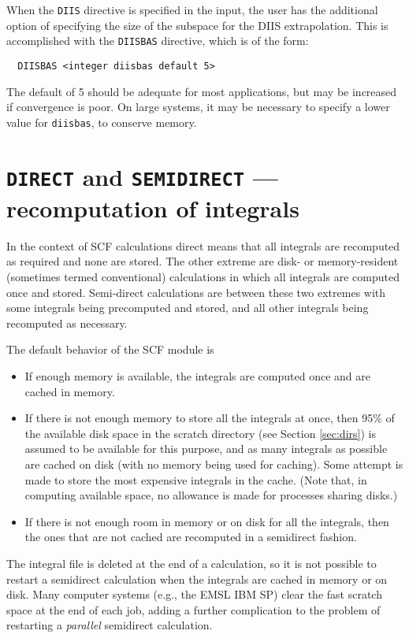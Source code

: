 When the \verb+DIIS+ directive is specified in the input, the user has
the additional option of specifying the size of the subspace for the
DIIS extrapolation.  This is accomplished with the \verb+DIISBAS+
directive, which is of the form:
\begin{verbatim}
  DIISBAS <integer diisbas default 5>
\end{verbatim}
The default of 5 should be adequate for most applications, but may be
increased if convergence is poor.  On large systems, it may be necessary
to specify a lower value for \verb+diisbas+, to conserve memory.

\section{{\tt DIRECT} and {\tt SEMIDIRECT} --- recomputation of integrals}
\label{sec:semidirect}

In the context of SCF calculations direct means that all integrals are
recomputed as required and none are stored.  The other extreme are
disk- or memory-resident (sometimes termed conventional) calculations
in which all integrals are computed once and stored.  Semi-direct
calculations are between these two extremes with some integrals being
precomputed and stored, and all other integrals being recomputed as
necessary.

The default behavior of the SCF module is
\begin{itemize}
\item If enough memory is available, the integrals are computed once
  and are cached in memory.
\item If there is not enough memory to store all the integrals at
  once, then 95\% of the available disk space in the scratch directory
  (see Section \ref{sec:dirs}) is assumed to be available for this
  purpose, and as many integrals as possible are cached on disk (with
  no memory being used for caching).  Some attempt is made to store
  the most expensive integrals in the cache.  (Note that, in computing
  available space, no allowance is made for processes sharing disks.)
 \item If there is not enough room in memory or on disk for all the
   integrals, then the ones that are not cached are recomputed in a
   semidirect fashion.
\end{itemize}

The integral file is deleted at the end of a calculation, so it is not
possible to restart a semidirect calculation when the integrals are
cached in memory or on disk.  Many computer systems (e.g., the EMSL
IBM SP) clear the fast scratch space at the end of each job, adding a
further complication to the problem of restarting a {\em parallel}
semidirect calculation.

